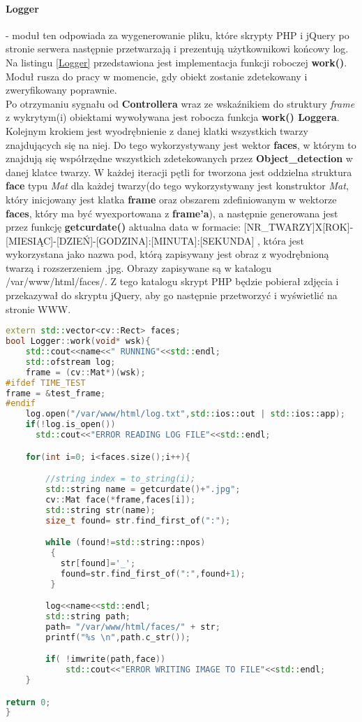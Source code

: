 \paragraph{Logger} - moduł ten odpowiada za wygenerowanie pliku, które skrypty PHP i jQuery po stronie serwera następnie przetwarzają i prezentują użytkownikowi końcowy log. Na listingu \ref{Logger} przedstawiona jest implementacja funkcji roboczej \textbf{work()}.
Moduł rusza do pracy w momencie, gdy obiekt zostanie zdetekowany i zweryfikowany poprawnie.\\
Po otrzymaniu sygnału od \textbf{Controllera} wraz ze wskaźnikiem do struktury \textit{frame} z wykrytym(i) obiektami wywoływana jest robocza funkcja \textbf{work() Loggera}.\\
Kolejnym krokiem jest wyodrębnienie z danej klatki wszystkich twarzy znajdujących się na niej. Do tego wykorzystywany jest wektor \textbf{faces}, w którym to znajdują się współrzędne wszystkich zdetekowanych przez \textbf{Object\_detection} w danej klatce twarzy. W każdej iteracji pętli for tworzona jest oddzielna struktura \textbf{face} typu \textit{Mat} dla każdej twarzy(do tego wykorzystywany jest konstruktor \textit{Mat}, który inicjowany jest klatka \textbf{frame} oraz obszarem zdefiniowanym w wektorze \textbf{faces}, który ma być wyexportowana z \textbf{frame'a}), a następnie generowana jest przez funkcję \textbf{getcurdate()} aktualna data w formacie: [NR\_TWARZY]X[ROK]-[MIESIĄC]-[DZIEŃ]-[GODZINA]:[MINUTA]:[SEKUNDA] , która jest wykorzystana jako nazwa pod, którą zapisywany jest obraz z wyodrębnioną twarzą i rozszerzeniem .jpg. Obrazy zapisywane są w katalogu /var/www/html/faces/. Z tego katalogu skrypt PHP będzie pobierał zdjęcia i przekazywał do skryptu jQuery, aby go następnie przetworzyć i wyświetlić na stronie WWW.
\begin{lstlisting}[caption = {Funkcja robocza klasy Logger.}, label=Logger, language=C++]
extern std::vector<cv::Rect> faces;
bool Logger::work(void* wsk){
	std::cout<<name<<" RUNNING"<<std::endl;
	std::ofstream log;
	frame = (cv::Mat*)(wsk);
#ifdef TIME_TEST
frame = &test_frame;
#endif
	log.open("/var/www/html/log.txt",std::ios::out | std::ios::app);
	if(!log.is_open())
	  std::cout<<"ERROR READING LOG FILE"<<std::endl;

	for(int i=0; i<faces.size();i++){

		//string index = to_string(i);
	    std::string name = getcurdate()+".jpg";
	    cv::Mat face(*frame,faces[i]);
	    std::string str(name);
	    size_t found= str.find_first_of(":");

	    while (found!=std::string::npos)
	     {
	       str[found]='_';
	       found=str.find_first_of(":",found+1);
	     }

	    log<<name<<std::endl;
	    std::string path;
	    path= "/var/www/html/faces/" + str;
	    printf("%s \n",path.c_str());

	    if( !imwrite(path,face))
	    	std::cout<<"ERROR WRITING IMAGE TO FILE"<<std::endl;
	}

return 0;
}
\end{lstlisting}

